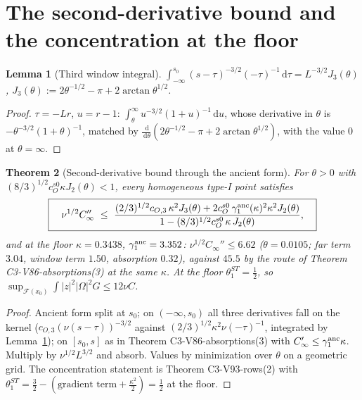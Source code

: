 \documentclass[11pt]{article}
\newcommand{\dd}{\,\mathrm d}
\theoremstyle{plain}
\newtheorem{theorem}{Theorem}[section]
\newtheorem{lemma}[theorem]{Lemma}
\theoremstyle{definition}
\theoremstyle{remark}
\begin{document}
\section{The second-derivative bound and the concentration at the floor}
\label{sec:c4v4-second}

\begin{lemma}[Third window integral]
\label{lem:c4v4-J3}
\(\int_{-\infty}^{s_0}(s-\tau)^{-3/2}(-\tau)^{-1}\dd\tau=L^{-3/2}J_3(\theta)\),
\(J_3(\theta):=2\theta^{-1/2}-\pi+2\arctan\theta^{1/2}\).
\end{lemma}

\begin{proof}
\(\tau=-Lr\), \(u=r-1\): \(\int_\theta^\infty u^{-3/2}(1+u)^{-1}\dd u\), whose derivative in \(\theta\) is
\(-\theta^{-3/2}(1+\theta)^{-1}\), matched by \(\frac{\dd}{\dd\theta}(2\theta^{-1/2}-\pi+2\arctan\theta^{1/2})\), with the
value \(0\) at \(\theta=\infty\).
\end{proof}

\begin{theorem}[Second-derivative bound through the ancient form]
\label{thm:c4v4-gamma2}
For \(\theta>0\) with \((8/3)^{1/2}c_O^{s0}\kappa J_2(\theta)<1\), every homogeneous type-I point
satisfies
\begin{equation}
 \boxed{\quad
 \nu^{1/2}C_\infty''\ \le\ \frac{(2/3)^{1/2}c_{O,3}\,\kappa^2J_3(\theta)+2c_O^{s0}\,\gamma_1^{\rm anc}(\kappa)^2\kappa^2J_2(\theta)}{1-(8/3)^{1/2}c_O^{s0}\,\kappa\,J_2(\theta)} ,
 \quad}
 \label{eq:c4v4-gamma2}
\end{equation}
and at the floor \(\kappa=0.3438\), \(\gamma_1^{\rm anc}=3.352\): \(\nu^{1/2}C_\infty''\le6.62\) (\(\theta=0.0105\); far term
\(3.04\), window term \(1.50\), absorption \(0.32\)), against \(45.5\) by the route of
Theorem C3-V86-absorptions(3) at the same \(\kappa\).  At the floor
\(\theta_1^{ST}=\frac12\), so \(\sup_{\mathcal F(x_0)}\int|z|^2|\Omega|^2G\le12\nu C\).
\end{theorem}

\begin{proof}
Ancient form split at \(s_0\); on \((-\infty,s_0)\) all three derivatives fall on
the kernel (\(c_{O,3}(\nu(s-\tau))^{-3/2}\) against \((2/3)^{1/2}\kappa^2\nu(-\tau)^{-1}\), integrated by
Lemma~\ref{lem:c4v4-J3}); on \([s_0,s]\) as in Theorem C3-V86-absorptions(3)
with \(C_\infty'\le\gamma_1^{\rm anc}\kappa\).  Multiply by \(\nu^{1/2}L^{3/2}\) and absorb.  Values by
minimization over \(\theta\) on a geometric grid.  The concentration
statement is Theorem C3-V93-rows(2) with \(\theta_1^{ST}=\frac32-(\text{gradient term}+\frac{\kappa^2}2)=\frac12\)
at the floor.
\end{proof}
\end{document}
